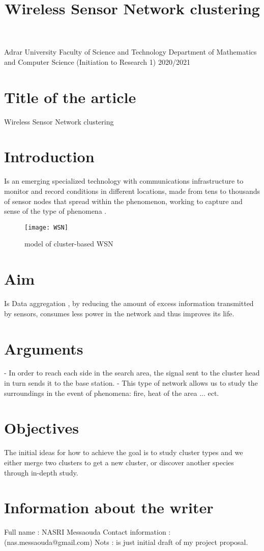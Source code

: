 \documentclass[14 pt]{article}
\title{Wireless Sensor Network clustering}
\begin{document}
Adrar  University  Faculty of Science and Technology 
Department of Mathematics and Computer Science 
    (Initiation to Research 1) 2020/2021 
\section*{ Title of  the article }
Wireless Sensor Network clustering
\section*{Introduction}
Is an emerging specialized technology with communications infrastructure to monitor and record conditions in different locations, made from tens to thousands of sensor nodes that spread within the phenomenon, working to capture and sense of the type of phenomena .
 \begin{figure}[h]
    \centering
    \texttt{[image: WSN]}
    \caption{model of cluster-based WSN }
    \label{fig:WSN}
\end{figure} 
 
\section*{Aim}
 Is Data aggregation , by reducing the amount of excess information transmitted by sensors, consumes less power in the network and thus improves its life. 
\section*{Arguments}
  - In order to reach each side in the search area, the signal sent to the cluster head in turn sends it to the base station. \linebreak
  - This type of network allows us to study the surroundings in the event of phenomena: fire, heat of the area ... ect. 
\section*{Objectives}
 The initial ideas for how to achieve the goal is to study cluster types and we either merge two clusters to get a new cluster, or discover another species through 
 in-depth study.
 \linebreak
\section*{Information about the writer}
Full name : NASRI Messaouda    
\linebreak Contact information : (nas.messaouda@gmail.com)
 \linebreak 
 \linebreak Nots : is just initial draft of my project proposal.
\end{document}
